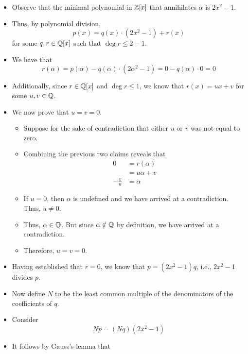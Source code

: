 \documentclass[../notes.tex]{subfiles}
\begin{document}
\begin{itemize}
\begin{itemize}
        \item Observe that the minimal polynomial in $\mathbb{Z}[x]$ that annihilates $\alpha$ is $2x^2-1$.
        \item Thus, by polynomial division,
        \begin{equation*}
            p(x) = q(x)\cdot(2x^2-1)+r(x)
        \end{equation*}
        for some $q,r\in\mathbb{Q}[x]$ such that $\deg r\leq 2-1$.
        \item We have that
        \begin{equation*}
            r(\alpha) = p(\alpha)-q(\alpha)\cdot(2\alpha^2-1)
            = 0-q(\alpha)\cdot 0
            = 0
        \end{equation*}
        \item Additionally, since $r\in\mathbb{Q}[x]$ and $\deg r\leq 1$, we know that $r(x)=ux+v$ for some $u,v\in\mathbb{Q}$.
        \item We now prove that $u=v=0$.
        \begin{itemize}
            \item Suppose for the sake of contradiction that either $u$ or $v$ was not equal to zero.
            \item Combining the previous two claims reveals that
            \begin{align*}
                0 &= r(\alpha)\\
                &= u\alpha+v\\
                -\frac{v}{u} &= \alpha
            \end{align*}
            \item If $u=0$, then $\alpha$ is undefined and we have arrived at a contradiction. Thus, $u\neq 0$.
            \item Thus, $\alpha\in\mathbb{Q}$. But since $\alpha\notin\mathbb{Q}$ by definition, we have arrived at a contradiction.
            \item Therefore, $u=v=0$.
        \end{itemize}
        \item Having established that $r=0$, we know that $p=(2x^2-1)q$, i.e., $2x^2-1$ divides $p$.
        \item Now define $N$ to be the least common multiple of the denominators of the coefficients of $q$.
        \item Consider
        \begin{equation*}
            Np = (Nq)(2x^2-1)
        \end{equation*}
        \item It follows by Gauss's lemma that

\end{itemize}
\end{itemize}
\end{document}
